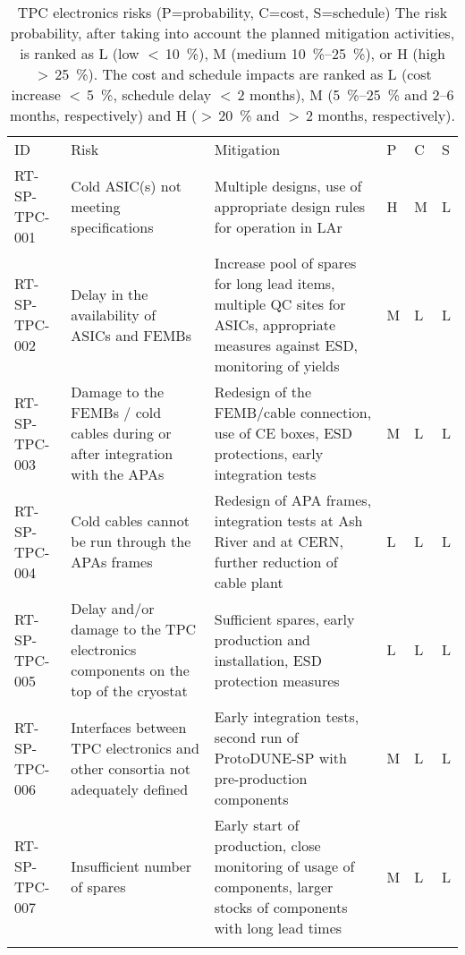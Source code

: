 
\begin{footnotesize}
\begin{longtable}{P{0.18\textwidth}P{0.20\textwidth}P{0.32\textwidth}P{0.02\textwidth}P{0.02\textwidth}P{0.02\textwidth}} 
\caption[TPC electronics risks]{TPC electronics risks (P=probability, C=cost, S=schedule) The risk probability, after taking into account the planned mitigation activities, is ranked as 
L (low $<\,$\SI{10}{\%}), 
M (medium \SIrange{10}{25}{\%}), or 
H (high $>\,$\SI{25}{\%}). 
The cost and schedule impacts are ranked as 
L (cost increase $<\,$\SI{5}{\%}, schedule delay $<\,$\num{2} months), 
M (\SIrange{5}{25}{\%} and 2--6 months, respectively) and 
H ($>\,$\SI{20}{\%} and $>\,$2 months, respectively). } \\
ID & Risk & Mitigation & P & C & S  \\  \colhline
RT-SP-TPC-001 & Cold ASIC(s) not meeting specifications & Multiple designs, use of appropriate design rules for operation in LAr & H  & M & L \\  \colhline
RT-SP-TPC-002 & Delay in the availability of ASICs and FEMBs & Increase pool of spares for long lead items, multiple QC sites for ASICs, appropriate measures against ESD, monitoring of yields & M & L & L \\  \colhline
RT-SP-TPC-003 & Damage to the FEMBs / cold cables during or after integration with the APAs & Redesign of the FEMB/cable connection, use of CE boxes, ESD protections, early integration tests & M & L & L \\  \colhline
RT-SP-TPC-004 & Cold cables cannot be run through the APAs frames & Redesign of APA frames, integration tests at Ash River and at CERN, further reduction of cable plant & L & L & L \\  \colhline
RT-SP-TPC-005 & Delay and/or damage to the TPC electronics components on the top of the cryostat & Sufficient spares, early production and installation, ESD protection measures & L & L & L \\  \colhline
RT-SP-TPC-006 & Interfaces between TPC electronics and other consortia not adequately defined & Early integration tests, second run of ProtoDUNE-SP with pre-production components & M & L & L \\  \colhline
RT-SP-TPC-007 & Insufficient number of spares & Early start of production, close monitoring of usage of components, larger stocks of components with long lead times & M & L & L \\  \colhline

\end{longtable}
\end{footnotesize}
